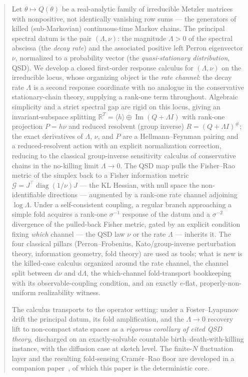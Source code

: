 \documentclass[11pt,reqno]{amsart}
\theoremstyle{plain}
\theoremstyle{definition}
\theoremstyle{remark}
\newcommand{\R}{\mathbb{R}}
\newcommand{\dd}{\mathrm{d}}
\DeclareMathOperator{\Imm}{Im}
\DeclareMathOperator{\diag}{diag}
\begin{document}
\begin{abstract}
Let $\theta\mapsto Q(\theta)$ be a real-analytic family of irreducible Metzler matrices with
nonpositive, not identically vanishing row sums --- the generators of killed (sub-Markovian)
continuous-time Markov chains. The principal spectral datum is the pair $(\Lambda,\nu)$: the magnitude
$\Lambda>0$ of the spectral abscissa (the \emph{decay rate}) and the associated positive left Perron
eigenvector $\nu$, normalized to a probability vector (the \emph{quasi-stationary distribution}, QSD).
We develop a closed first-order response calculus for $(\Lambda,\nu)$ on the irreducible locus, whose
organizing object is the \emph{rate channel}: the decay rate $\Lambda$ is a second response coordinate
with no analogue in the conservative stationary-chain theory, supplying a rank-one term throughout.
Algebraic simplicity and a strict spectral gap are rigid on this locus, giving an invariant-subspace
splitting $\R^{T}=\langle h\rangle\oplus\Imm(Q+\Lambda I)$ with rank-one projection $P=h\nu$ and reduced
resolvent (group inverse) $R=(Q+\Lambda I)^{\#}$; the exact derivatives of $\Lambda$, $\nu$, and $P$ are
a Hellmann--Feynman pairing and a reduced-resolvent action with an explicit normalization correction,
reducing to the classical group-inverse sensitivity calculus of conservative chains in the no-killing
limit $\Lambda\to0$. The QSD map pulls the Fisher--Rao metric of the simplex back to a Fisher
information metric $\mathcal G=J^{\top}\diag(1/\nu)J$ --- the KL Hessian, with null space the
non-identifiable directions --- augmented by a rank-one rate channel adjoining $\log\Lambda$. Under a
self-consistent coupling, a regular branch approaching a simple fold acquires a rank-one $\sigma^{-1}$
response of the datum and a $\sigma^{-2}$ divergence of the pulled-back Fisher metric, gated by an
explicit condition fixing \emph{which} channel --- the QSD law $\nu$ or the rate $\Lambda$ ---
inherits it. The four classical pillars (Perron--Frobenius, Kato/group-inverse perturbation theory,
information geometry, fold theory) are used as tools; what is new is the killed-case calculus organized
around the rate channel, the channel split between $\dd\nu$ and $\dd\Lambda$, the which-channel
fold-transport bookkeeping with its observable-coupling condition, and an exactly $e$-flat,
properly-non-uniform realizability witness.

The calculus transports to the operator setting: under a Foster--Lyapunov drift the principal datum,
its fold amplification, and the $\Lambda\to0$ recovery lift to non-compact state spaces as a
\emph{rigorous corollary of cited QSD theory}, discharged on an exactly-solvable countable
birth--death-with-killing instance, with the diffusion case at sketch level. The finite-$N$ fluctuation
layer and the resulting fold-sensing Cram\'er--Rao floor are developed in a companion
paper~\cite{SarkarFoldSensing}, of which this paper is the deterministic core.
\end{abstract}
\end{document}
